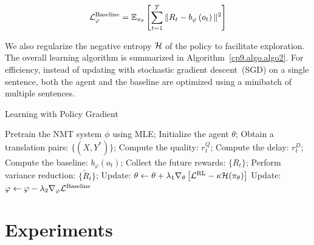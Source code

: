 \begin{equation}
   \mathcal{L}^{\text{Baseline}}_{\varphi} = \mathbb{E}_{\pi_{\theta}}\left[ \sum_{t=1}^T\|R_t - b_{\varphi}\left(o_t\right)\|^2 \right]
\end{equation}

We also regularize the negative entropy $\mathcal{H}$ of  the policy 
to facilitate exploration. 
The overall learning algorithm is summarized in Algorithm~\ref{cp9.algo.algo2}. For efficiency, instead of updating with stochastic gradient descent~(SGD) on a single sentence, both the agent and the baseline are optimized using 
a minibatch of multiple sentences.

\begin{algorithm}[t]
\caption{Learning with Policy Gradient}
\label{cp9.algo.algo2}
\begin{algorithmic}[1]
{}
\State Pretrain the NMT system $\phi$ using MLE;
\State Initialize the agent $\theta$;
\State Obtain a translation pairs: $\{(X, Y^*)\}$;
\State Compute the quality: $r_t^Q$;
\State Compute the delay: $r_t^D$;
\State Compute the baseline: $b_{\varphi}\left(o_t\right)$;
\EndFor
\EndFor
\State Collect the future rewards: $\{R_t\}$;
\State Perform variance reduction: $\{\tilde{R}_t\}$;
\State Update: $\theta \gets \theta + \lambda_1 \nabla_{\theta}\left[\mathcal{L}^{\text{RL}} - \kappa\mathcal{H}(\pi_{\theta})\right]$
\State Update: $\varphi \gets \varphi - \lambda_2 \nabla_{\varphi}\mathcal{L}^{\text{Baseline}}$
\EndWhile
\end{algorithmic}
\end{algorithm}






\section{Experiments}
\label{cp9.sec.experiments}

